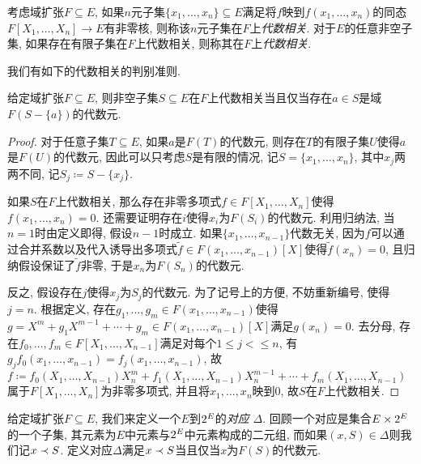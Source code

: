 \begin{definition}
  考虑域扩张$F\subseteq E$, 如果$n$元子集$\{x_1, \dotsc, x_n\}\subseteq E$满足将$f$映到$f(x_1, \dotsc, x_n)$的同态$F[X_1, \dotsc, X_n]\to E$有非零核, 则称该$n$元子集在$F$上\emph{代数相关}. 对于$E$的任意非空子集, 如果存在有限子集在$F$上代数相关, 则称其在$F$上\emph{代数相关}.
\end{definition}

我们有如下的代数相关的判别准则.

\begin{proposition}\label{prop:algbdependcrit}
  给定域扩张$F\subseteq E$, 则非空子集$S\subseteq E$在$F$上代数相关当且仅当存在$a\in S$是域$F(S-\{a\})$的代数元.
\end{proposition}

\begin{proof}
  对于任意子集$T\subseteq E$, 如果$a$是$F(T)$的代数元, 则存在$T$的有限子集$U$使得$a$是$F(U)$的代数元, 因此可以只考虑$S$是有限的情况, 记$S=\{x_1, \dotsc, x_n\}$, 其中$x_j$两两不同, 记$S_j\coloneq S-\{x_j\}$.

  如果$S$在$F$上代数相关, 那么存在非零多项式$f\in F[X_1, \dotsc, X_n]$使得$f(x_1, \dotsc, x_n)=0$. 还需要证明存在$i$使得$x_i$为$F(S_i)$的代数元. 利用归纳法, 当$n=1$时由定义即得, 假设$n-1$时成立. 如果$\{x_1, \dotsc, x_{n-1}\}$代数无关, 因为$f$可以通过合并系数以及代入诱导出多项式$\tilde{f}\in F(x_1, \dotsc, x_{n-1})[X]$使得$\tilde{f}(x_n)=0$, 且归纳假设保证了$\tilde{f}$非零, 于是$x_n$为$F(S_n)$的代数元.

  反之, 假设存在$j$使得$x_j$为$S_j$的代数元. 为了记号上的方便, 不妨重新编号, 使得$j=n$. 根据定义, 存在$g_1, \dotsc, g_m\in F(x_1, \dotsc, x_{n-1})$使得$g=X^m+g_1X^{m-1}+\dotsb+g_m\in F(x_1, \dotsc, x_{n-1})[X]$满足$g(x_n)=0$. 去分母, 存在$f_0, \dotsc, f_m\in F[X_1, \dotsc, X_{n-1}]$满足对每个$1\leq j<\leq n$, 有$g_jf_0(x_1, \dotsc, x_{n-1})=f_j(x_1, \dotsc, x_{n-1})$, 故$f\coloneq f_0(X_1, \dotsc, X_{n-1})X_n^m+f_1(X_1, \dotsc, X_{n-1})X_n^{m-1}+\dotsb+f_m(X_1, \dotsc, X_{n-1})$属于$F[X_1, \dotsc, X_n]$为非零多项式, 并且将$x_1, \dotsc, x_n$映到0, 故$S$在$F$上代数相关.
\end{proof}

给定域扩张$F\subseteq E$, 我们来定义一个$E$到$2^{E}$的\emph{对应} $\Delta$. 回顾一个对应是集合$E\times 2^{E}$的一个子集, 其元素为$E$中元素与$2^{E}$中元素构成的二元组, 而如果$(x, S)\in\Delta$则我们记$x\prec S$. 定义对应$\Delta$满足$x\prec S$当且仅当$x$为$F(S)$的代数元.

